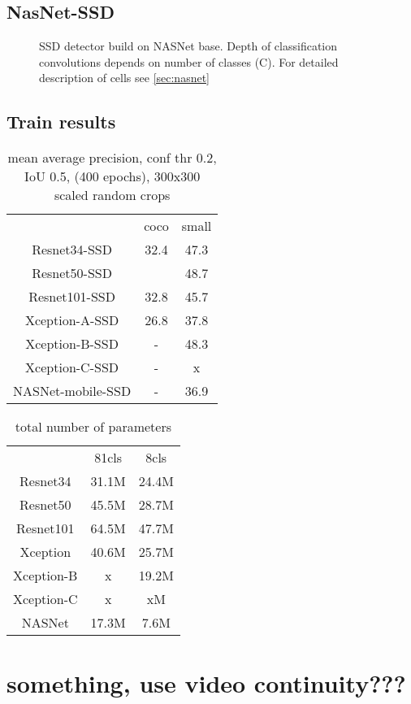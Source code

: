 \subsection{NasNet-SSD}

\begin{figure}
    \nasnetSSD
    \caption{SSD detector build on NASNet base. Depth of classification convolutions depends on number of classes (C). For detailed description of cells see \cref{sec:nasnet}}
    \label{fig:nasnetSSD}
\end{figure}


\subsection{Train results}
\begin{table}
    \begin{tabular}{c|c|c}
                        & coco      & small \\
        Resnet34-SSD    & 32.4      & 47.3  \\
        Resnet50-SSD    &           & 48.7  \\
        Resnet101-SSD   & 32.8      & 45.7  \\
        Xception-A-SSD  & 26.8      & 37.8  \\
        Xception-B-SSD  & -         & 48.3  \\
        Xception-C-SSD  & -         & x     \\
        NASNet-mobile-SSD & -       & 36.9  \\
    \end{tabular}
    \caption{mean average precision, conf thr 0.2, IoU 0.5,  (400 epochs), 300x300 scaled random crops}
    \label{tab:map}
\end{table}


\begin{table}
    \begin{tabular}{c|c|c}
     & 81cls & 8cls  \\
    Resnet34 & 31.1M & 24.4M\\
    Resnet50 & 45.5M & 28.7M\\
    Resnet101 & 64.5M & 47.7M \\
    Xception & 40.6M & 25.7M \\
    Xception-B & x & 19.2M \\
    Xception-C & x & xM \\
    NASNet & 17.3M & 7.6M \\
    \end{tabular}
    \caption{total number of parameters}
    \label{tab:parameters}
\end{table}



\section{something, use video continuity???}